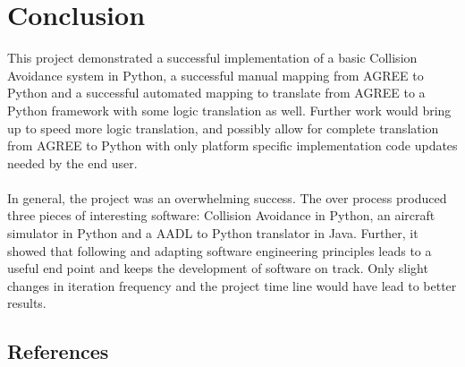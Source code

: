 \documentclass[12pt]{report}
\theoremstyle{plain}
\theoremstyle{definition}
\begin{document}
\chapter*{Conclusion}
This project demonstrated a successful implementation of a basic Collision Avoidance system in Python, a successful manual mapping from AGREE to Python and a successful automated mapping to translate from AGREE to a Python framework with some logic translation as well.  Further work would bring up to speed more logic translation, and possibly allow for complete translation from AGREE to Python with only platform specific implementation code updates needed by the end user.\\
\\
In general, the project was an overwhelming success.  The over process produced three pieces of interesting software: Collision Avoidance in Python, an aircraft simulator in Python and a AADL to Python translator in Java.  Further, it showed that following and adapting software engineering principles leads to a useful end point and keeps the development of software on track. Only slight changes in iteration frequency and the project time line would have lead to better results.
\pagebreak
\section*{References}
\end{document}
